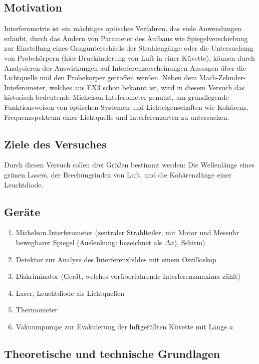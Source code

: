 \subsection{Motivation}
Interferometrie ist ein mächtiges optisches Verfahren, das viele Anwendungen erlaubt, durch das Ändern von Parameter des Aufbaus wie Spiegelverschiebung zur Einstellung eines Gangunterschieds der Strahlengänge oder die Untersuchung von Probekörpern (hier Druckänderung von Luft in einer Küvette), können durch Analysieren der Auswirkungen auf Interferenzerscheinungen Aussagen über die Lichtquelle und den Probekörper getroffen werden. Neben dem Mach-Zehnder-Inteferometer, welches aus EX3 schon bekannt ist, wird in diesem Versuch das historisch bedeutende Michelson-Inteferometer genutzt, um grundlegende Funktionsweisen von optischen Systemen und Lichteigenschaften wie Kohärenz, Frequenzspektrum einer Lichtquelle und Interferenzarten zu untersuchen. 

\subsection{Ziele des Versuches}
Durch diesen Versuch sollen drei Größen bestimmt werden: Die Wellenlänge eines grünen Lasers, der Brechungsindex von Luft, und die Kohärenzlänge einer Leuchtdiode.
\subsection{Geräte}
\begin{enumerate}[noitemsep]
    \item Michelson Interferometer (zentraler Strahlteiler, mit Motor und Messuhr bewegbarer Spiegel (Auslenkung: bezeichnet als \(\Delta x\)), Schirm)
    \item Detektor zur Analyse des Interferenzbildes mit einem Oszilloskop
    \item Diskriminator (Gerät, welches vorüberfahrende Interferenzmaxima zählt)
    \item Laser, Leuchtdiode als Lichtquellen
    \item Thermometer
    \item Vakuumpumpe zur Evakuierung der luftgefüllten Küvette mit Länge \(a\)
\end{enumerate}

\newpage

\subsection[Theoretische und technische Grundlagen]{Theoretische und technische Grundlagen \protect\autocite{Skript_2.1}}

